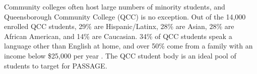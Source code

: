 \documentclass[12pt]{article}
\begin{document}

	
Community colleges often host large numbers of minority students, and Queensborough Community College (QCC) is no exception.  Out of the 14,000 enrolled QCC students, 29\% are Hispanic/Latinx, 28\% are Asian, 28\% are African American, and 14\% are Caucasian.  34\% of QCC students speak a language other than English at home, and over 50\% come from a family with an income below \$25,000 per year \citep{QCCweb}. The QCC student body is an ideal pool of students to target for PASSAGE.
\end{document}
